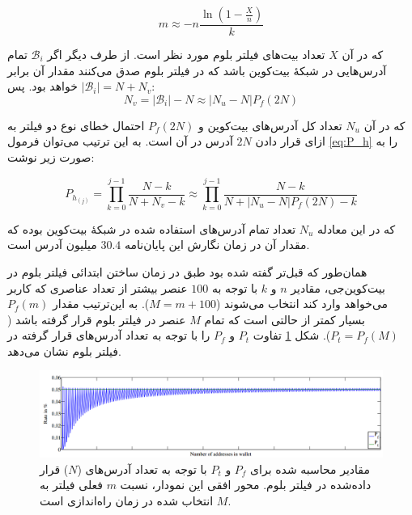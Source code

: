    \begin{equation}
  \label{eq:m_estimation}
 m \approx -n\frac{\ln\left(1-\frac{X}{n}\right)}{k}
  \end{equation}
 
 که در آن $X$ تعداد بیت‌های فیلتر بلوم مورد نظر است. از طرف دیگر  اگر 
 $\mathcal{B}_i$
 تمام آدرس‌هایی در شبکهٔ بیت‌کوین باشد که در فیلتر بلوم صدق می‌کنند مقدار آن برابر 
 $|\mathcal{B}_i| = N + N_v$
 خواهد بود. پس:
  \begin{equation}
 \label{eq:N_v_estimation}
 N_v = |\mathcal{B}_i| - N  \approx  |N_u-N|P_f(2N) 
 \end{equation}
 
 که در آن $N_u$ تعداد کل آدرس‌های بیت‌کوین و $P_f(2N)$ احتمال خطای نوع دو فیلتر به ازای قرار دادن $2N$ آدرس در آن است. به این ترتیب می‌توان فرمول \eqref{eq:P_h} را به صورت زیر نوشت:
 
  \begin{equation}
 \label{eq:P_h_estimation}
 P_{h_{(j)}} = \prod_{k=0}^{j-1}\frac{N-k}{N+N_v-k} \approx \prod_{k=0}^{j-1}\frac{N-k}{N+|N_u-N|P_f(2N)-k}
 \end{equation}

که در این معادله $N_u$ تعداد تمام آدرس‌های استفاده شده در شبکهٔ بیت‌کوین بوده که مقدار آن در زمان نگارش این پایان‌نامه $30.4$ میلیون آدرس است.

همان‌طور که قبل‌تر گفته شده بود طبق \cite{Gervais2014} در زمان ساختن ابتدائی فیلتر بلوم در بیت‌کوین‌جی، مقادیر $n$ و $k$ با توجه به $100$ عنصر بیشتر از تعداد عناصری که کاربر می‌خواهد وارد کند انتخاب می‌شوند ($M=m+100$). به این‌ترتیب مقدار $P_f(m)$ بسیار کمتر از حالتی است که تمام $M$ عنصر در فیلتر بلوم قرار گرفته باشد ($P_t = P_f(M)$). شکل \ref{fig:ptvspf} تفاوت $P_t$ و $P_f$ را با توجه به تعداد آدرس‌های قرار گرفته در فیلتر بلوم نشان می‌دهد. 

\begin{figure}
	\centering
	\includegraphics[width=\linewidth]{image/Pt_vs_Pf}
	\caption{
		مقادیر محاسبه شده برای $P_f$ و $P_t$ با توجه به تعداد آدرس‌های ($N$) قرار داده‌شده در فیلتر بلوم. محور افقی این نمودار، نسبت $m$ فعلی فیلتر به $M$ انتخاب شده در زمان راه‌اندازی است.
		\cite{Gervais2014}}
	\label{fig:ptvspf}
\end{figure}

